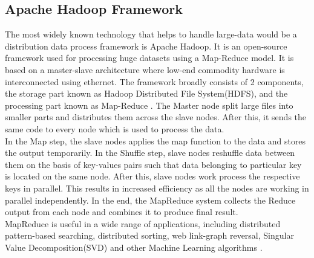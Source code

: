 \documentclass[sigconf]{acmart}
\begin{document}
\subsection{Apache Hadoop Framework}
The most widely known technology that helps to handle large-data would be a distribution data process framework is Apache Hadoop. It is an open-source framework used for processing huge datasets using a Map-Reduce model. It is based on a master-slave architecture where low-end commodity hardware is interconnected using ethernet. The framework broadly consists of 2 components, the storage part known as Hadoop Distributed File System(HDFS), and the processing part known as Map-Reduce \cite{hadoopwiki}. The Master node split large files into smaller parts and distributes them across the slave nodes. After this, it sends the same code to every node which is used to process the data.\\
In the Map step, the slave nodes applies the map function to the data and stores the output temporarily. In the Shuffle step, slave nodes reshuffle data between them on the basis of key-values pairs such that data belonging to particular key is located on the same node. After this, slave nodes work process the respective keys in parallel. This results in increased efficiency as all the nodes are working in parallel independently. In the end, the MapReduce system collects the Reduce output from each node and combines it to produce final result.\\
MapReduce is useful in a wide range of applications, including distributed pattern-based searching, distributed sorting, web link-graph reversal, Singular Value Decomposition(SVD) and other Machine Learning algorithms \cite{hadoopwiki}.
\end{document}
